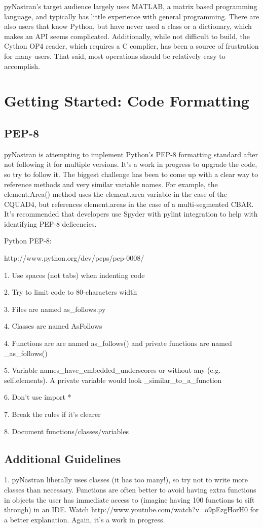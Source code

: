      pyNastran's target audience largely uses MATLAB, a matrix based programming language, and typically has little experience with general programming.  There are also users that know Python, but have never used a class or a dictionary, which makes an API seems complicated.  Additionally, while not difficult to build, the Cython OP4 reader, which requires a C complier, has been a source of frustration for many users.  That said, most operations should be relatively easy to accomplish.


\section{Getting Started: Code Formatting}
 \subsection{PEP-8}
     pyNastran is attempting to implement Python's PEP-8 formatting standard after not following it for multiple versions.  It's a work in progress to upgrade the code, so try to follow it.  The biggest challenge has been to come up with a clear way to reference methods and very similar variable names.  For example, the element.Area() method uses the element.area variable in the case of the CQUAD4, but references element.areas in the case of a multi-segmented CBAR.  It's recommended that developers use Spyder with pylint integration to help with identifying PEP-8 deficencies.

    Python PEP-8:
     
     http://www.python.org/dev/peps/pep-0008/

     1.  Use spaces (not tabs) when indenting code

     2.  Try to limit code to 80-characters width

     3.  Files are named as\_follows.py

     4.  Classes are named AsFollows

     4.  Functions are are named as\_follows() and private functions are named \_as\_follows()

     5.  Variable names\_have\_embedded\_underscores or without any (e.g. self.elements).  A private variable would look \_similar\_to\_a\_function

     6.  Don't use import *

     7.  Break the rules if it's clearer

     8.  Document functions/classes/variables

 \subsection{Additional Guidelines}
     1.  pyNastran liberally uses classes (it has too many!), so try not to write more classes than necessary.  Functions are often better to avoid having extra functions in objects the user has immediate access to (imagine having 100 functions to sift through) in an IDE.  Watch http://www.youtube.com/watch?v=o9pEzgHorH0 for a better explanation.  Again, it's a work in progress.

